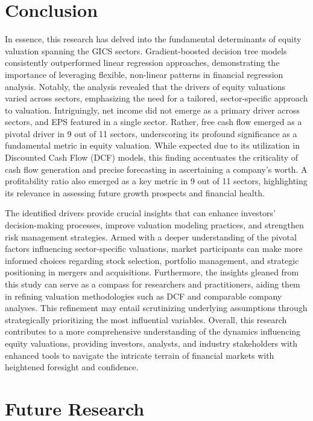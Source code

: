 \documentclass[12pt,a4paper,english]{article}
\begin{document}
\section{Conclusion}

In essence, this research has delved into the fundamental determinants of equity valuation spanning the GICS sectors. Gradient-boosted decision tree models consistently outperformed linear regression approaches, demonstrating the importance of leveraging flexible, non-linear patterns in financial regression analysis. Notably, the analysis revealed that the drivers of equity valuations varied across sectors, emphasizing the need for a tailored, sector-specific approach to valuation. Intriguingly, net income did not emerge as a primary driver across sectors, and EPS featured in a single sector. Rather, free cash flow emerged as a pivotal driver in 9 out of 11 sectors, underscoring its profound significance as a fundamental metric in equity valuation. While expected due to its utilization in Discounted Cash Flow (DCF) models, this finding accentuates the criticality of cash flow generation and precise forecasting in ascertaining a company's worth. A profitability ratio also emerged as a key metric in 9 out of 11 sectors, highlighting its relevance in assessing future growth prospects and financial health.

The identified drivers provide crucial insights that can enhance investors' decision-making processes, improve valuation modeling practices, and strengthen risk management strategies. Armed with a deeper understanding of the pivotal factors influencing sector-specific valuations, market participants can make more informed choices regarding stock selection, portfolio management, and strategic positioning in mergers and acquisitions. Furthermore, the insights gleaned from this study can serve as a compass for researchers and practitioners, aiding them in refining valuation methodologies such as DCF and comparable company analyses. This refinement may entail scrutinizing underlying assumptions through strategically prioritizing the most influential variables. Overall, this research contributes to a more comprehensive understanding of the dynamics influencing equity valuations, providing investors, analysts, and industry stakeholders with enhanced tools to navigate the intricate terrain of financial markets with heightened foresight and confidence.

\section{Future Research}
\end{document}
